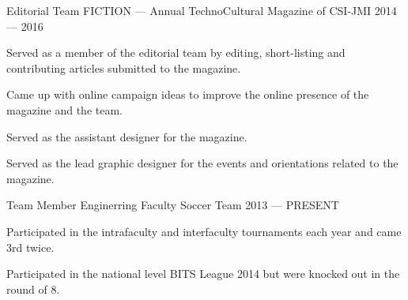 \begin{cventries}
  \cventry%
    {Editorial Team} %
    {FICTION --- Annual TechnoCultural Magazine of CSI-JMI} %
    {} %
    {2014 --- 2016} %
    {%
      \begin{cvitems} %
        \item{Served as a member of the editorial team by editing, short-listing and contributing articles submitted to the magazine.}
        \item{Came up with online campaign ideas to improve the online presence of the magazine and the team.}
        \item{Served as the assistant designer for the magazine.}
        \item{Served as the lead graphic designer for the events and orientations related to the magazine.}
      \end{cvitems}
    }

  \cventry%
    {Team Member} %
    {Enginerring Faculty Soccer Team} %
    {} %
    {2013 --- PRESENT} %
    {%
      \begin{cvitems} %
        \item{Participated in the intrafaculty and interfaculty tournaments each year and came 3rd twice.}
        \item{Participated in the national level BITS League 2014 but were knocked out in the round of 8.}
      \end{cvitems}
    }

\end{cventries}

